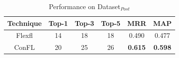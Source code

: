 \vspace{-0.5em}
\begin{table}[H]\footnotesize
\caption{Performance on Dataset$_{Post}$} \label{tab:postcutoff}
\vspace{-8pt}
\begin{tabular}{c|ccc|cc}
\toprule
Technique & Top-1 & Top-3 & Top-5 & MRR & MAP \\ \hline
Flexfl    & 14      &   18    & 18       & 0.490   & 0.477    \\ \hline
ConFL     & 20      &  25     & 26      & \textbf{0.615}    & \textbf{0.598}    \\ \bottomrule
\end{tabular}
\end{table}
\vspace{-0.5em}
